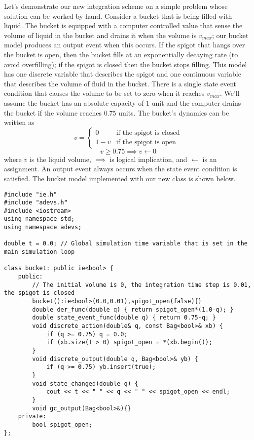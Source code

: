 Let's demonstrate our new integration scheme on a simple problem whose solution can be worked by hand. Consider a bucket that is being filled with liquid. The bucket is equipped with a computer controlled value that sense the volume of liquid in the bucket and drains it when the volume is $v_{max}$; our bucket model produces an output event when this occurs. If the spigot that hangs over the bucket is open, then the bucket fills at an exponentially decaying rate (to avoid overfilling); if the spigot is closed then the bucket stops filling. This model has one discrete variable that describes the spigot and one continuous variable that describes the volume of fluid in the bucket. There is a single state event condition that causes the volume to be set to zero when it reaches $v_{max}$. We'll assume the bucket has an absolute capacity of 1 unit and the computer drains the bucket if the volume reaches $0.75$ units. The bucket's dynamics can be written as
\begin{equation*}
\dot{v} =
\begin{cases}
0 & \text{if the spigot is closed} \\
1 - v & \text{if the spigot is open}
\end{cases}
\end{equation*}
\begin{equation*}
v \geq 0.75 \implies v \leftarrow 0
\end{equation*}
where $v$ is the liquid volume, $\implies$ is logical implication, and $\leftarrow$ is an assignment. An output event always occurs when the state event condition is satisfied.
The bucket model implemented with our new  class is shown below.
\begin{verbatim}
#include "ie.h"
#include "adevs.h"
#include <iostream>
using namespace std;
using namespace adevs;

double t = 0.0; // Global simulation time variable that is set in the main simulation loop

class bucket: public ie<bool> {
    public:
        // The initial volume is 0, the integration time step is 0.01, the spigot is closed
        bucket():ie<bool>(0.0,0.01),spigot_open(false){}
        double der_func(double q) { return spigot_open*(1.0-q); }
        double state_event_func(double q) { return 0.75-q; }
        void discrete_action(double& q, const Bag<bool>& xb) {
            if (q >= 0.75) q = 0.0;
            if (xb.size() > 0) spigot_open = *(xb.begin());
        }
        void discrete_output(double q, Bag<bool>& yb) {
            if (q >= 0.75) yb.insert(true);
        }
        void state_changed(double q) {
            cout << t << " " << q << " " << spigot_open << endl;
        }
        void gc_output(Bag<bool>&){}
    private:
        bool spigot_open;
};
\end{verbatim}

